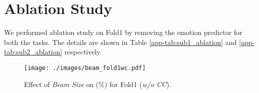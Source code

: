 \documentclass{article}
\begin{document}
\section{Ablation Study} \label{app:ablation}
We performed ablation study on Fold1 by removing the emotion predictor for both the tasks. The details are shown in Table \ref{app-tab:sub1_ablation} and \ref{app-tab:sub2_ablation} respectively. 



\begin{figure}[h]
\centering
  \texttt{[image: ./images/beam\_fold1wc.pdf]}
  \caption{Effect of \textit{Beam Size} on  (\%) for Fold1 (\textit{w/o CC}). }
  \label{fig:beam}
\end{figure}
\end{document}
